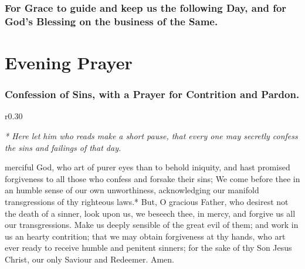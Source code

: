 \subsubsection{For Grace to guide and keep us the following Day, and for God’s Blessing on the business of the Same.}

\theGrace
 
 

\section{Evening Prayer}

\ourFather

\centerline{}


\subsubsection{Confession of Sins, with a Prayer for Contrition and Pardon.}
\begin{wrapfigure}{r}{0.30\textwidth}
\par{\footnotesize\red\emph{* Here let him who reads make a short pause, that every one may secretly confess the sins and failings of that day.}\par}
\end{wrapfigure}
 merciful God, who art of purer eyes than to behold iniquity, and hast promised forgiveness to all those who confess and forsake their sins; We come before thee in an humble sense of our own unworthiness, acknowledging our manifold transgressions of thy righteous laws.* But, O gracious Father, who desirest not the death of a sinner, look upon us, we beseech thee, in mercy, and forgive us all our transgressions. Make us deeply sensible of the great evil of them; and work in us an hearty contrition; that we may obtain forgiveness at thy hands, who art ever ready to receive humble and penitent sinners; for the sake of thy Son Jesus Christ, our only Saviour and Redeemer. Amen.



